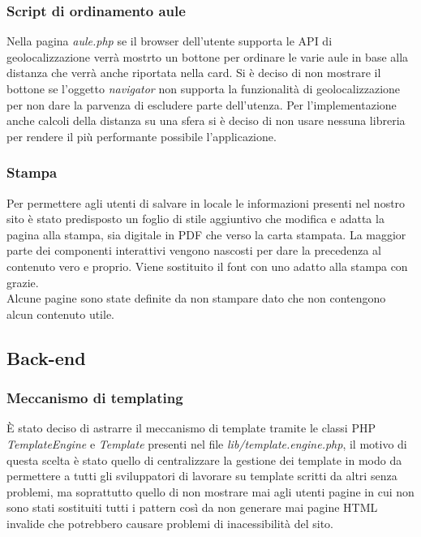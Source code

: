 \subsubsection{Script di ordinamento aule}
Nella pagina \textit{aule.php} se il browser dell'utente supporta le API di geolocalizzazione verrà mostrto un bottone per ordinare le varie aule in base alla distanza che verrà anche riportata nella card. Si è deciso di non mostrare il bottone se l'oggetto \textit{navigator} non supporta la funzionalità di geolocalizzazione per non dare la parvenza di escludere parte dell'utenza. Per l'implementazione anche calcoli della distanza su una sfera si è deciso di
non usare nessuna libreria per rendere il più performante possibile l'applicazione.

\subsubsection{Stampa}
Per permettere agli utenti di salvare in locale le informazioni presenti nel nostro sito è stato predisposto un foglio di stile aggiuntivo che modifica e adatta la pagina alla stampa, sia digitale in PDF che verso la carta stampata. La maggior parte dei componenti interattivi vengono nascosti per dare la precedenza al contenuto vero e proprio. Viene sostituito il font con uno adatto alla stampa con grazie.\\
Alcune pagine sono state definite da non stampare dato che non contengono alcun contenuto utile.

\subsection{Back-end}

\subsubsection{Meccanismo di templating}
È stato deciso di astrarre il meccanismo di template tramite le classi PHP \textit{TemplateEngine} e \textit{Template} presenti nel file \textit{lib/template.engine.php}, il motivo di questa scelta è stato quello di centralizzare la gestione dei template in modo da permettere a tutti gli sviluppatori di lavorare su template scritti da altri senza problemi, ma soprattutto quello di non mostrare mai agli utenti pagine in cui non sono stati sostituiti tutti i pattern così da non generare mai pagine HTML invalide che potrebbero causare problemi di inacessibilità del sito.

